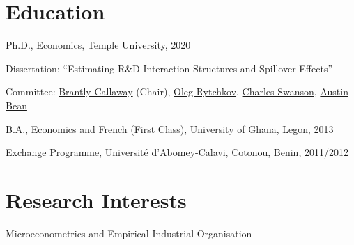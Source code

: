 \documentclass[12pt,letterpaper]{article}
\renewenvironment{itemize}{
  \begin{list}{}{
    \setlength{\leftmargin}{1.5em}
  }
}{
  \end{list}
}
\begin{document}
\section*{Education}

\begin{itemize}
  \item Ph.D., Economics, Temple University, 2020
  \begin{itemize}
    \item Dissertation: ``Estimating R\&D Interaction Structures and Spillover Effects''
    \item Committee:   \href{https://bcallaway11.github.io/index.html}
    {Brantly Callaway} (Chair), \href{https://astro.temple.edu/~rytchkov/}{Oleg Rytchkov}, \href{https://liberalarts.temple.edu/academics/faculty/swanson-charles}{Charles Swanson}, \href{https://liberalarts.temple.edu/academics/faculty/bean-austin}{Austin Bean} 
  \end{itemize}


  \item B.A., Economics and French (First Class), University of Ghana, Legon, 2013
  \item  Exchange Programme, Universit\'{e} d'Abomey-Calavi, Cotonou, Benin, 2011/2012
\end{itemize}

\section*{Research Interests}
\begin{itemize}
  \item Microeconometrics and Empirical Industrial Organisation
\end{itemize}
\end{document}
